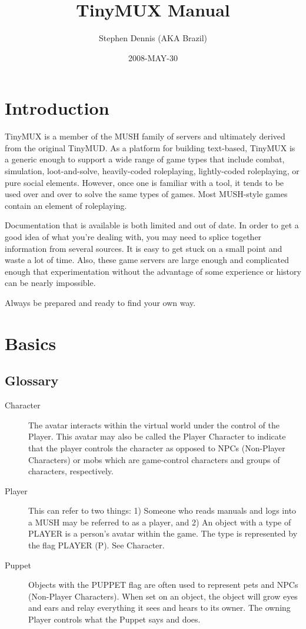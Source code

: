 \documentclass[10pt,letterpaper]{book}
\title{TinyMUX Manual}
\author{Stephen Dennis (AKA Brazil)}
\date{2008-MAY-30}
\begin{document}
\frontmatter
\maketitle

\mainmatter
\chapter{Introduction}
TinyMUX is a member of the MUSH family of servers and ultimately
derived from the original TinyMUD.
As a platform for building text-based, TinyMUX is a generic enough to support
a wide range of game types that include combat, simulation, loot-and-solve,
heavily-coded roleplaying, lightly-coded roleplaying, or pure social elements.
However, once one is familiar with a tool, it tends to be used over and over
to solve the same types of games.
Most MUSH-style games contain an element of roleplaying.

Documentation that is available is both limited and out of date. In order to
get a good idea of what you're dealing with, you may need to splice together
information from several sources. It is easy to get stuck on a small point
and waste a lot of time.  Also, these game servers are large enough and
complicated enough that experimentation without the advantage of some
experience or history can be nearly impossible.

Always be prepared and ready to find your own way.

\chapter{Basics}
\section{Glossary}

\begin{description}
\item[Character]
The avatar interacts within the virtual world under the
control of the Player.
This avatar may also be called the Player Character to indicate that the
player controls the character as opposed to NPCs (Non-Player Characters) or
mobs which are game-control characters and groups of characters, respectively.

\item[Player]
This can refer to two things: 1) Someone who reads manuals and
logs into a MUSH may be referred to as a player, and 2) An object with a type of
PLAYER is a person's avatar within the game.
The type is represented by the flag PLAYER (P).
See Character.

\item[Puppet]
Objects with the PUPPET flag are often used to represent pets and NPCs
(Non-Player Characters).
When set on an object, the object will grow eyes and ears and relay everything
it sees and hears to its owner. The owning Player controls what the Puppet
says and does.

\end{description}
\end{document}
